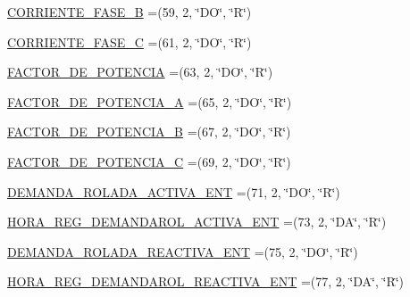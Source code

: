 \begin{DoxyCompactItemize}
\item 
\hyperlink{enumcom_1_1eneri_1_1scorpio__metertool_1_1devices_1_1_register_af873755785c13362257e1f389e8560d6}{C\+O\+R\+R\+I\+E\+N\+T\+E\+\_\+\+F\+A\+S\+E\+\_\+B} =(59, 2, \char`\"{}DO\char`\"{}, \char`\"{}R\char`\"{})
\item 
\hyperlink{enumcom_1_1eneri_1_1scorpio__metertool_1_1devices_1_1_register_ae8baada86efd91bd63541860ca63734c}{C\+O\+R\+R\+I\+E\+N\+T\+E\+\_\+\+F\+A\+S\+E\+\_\+C} =(61, 2, \char`\"{}DO\char`\"{}, \char`\"{}R\char`\"{})
\item 
\hyperlink{enumcom_1_1eneri_1_1scorpio__metertool_1_1devices_1_1_register_a9f66b6f3261ef38bcbe7ab1961222c4d}{F\+A\+C\+T\+O\+R\+\_\+\+D\+E\+\_\+\+P\+O\+T\+E\+N\+C\+IA} =(63, 2, \char`\"{}DO\char`\"{}, \char`\"{}R\char`\"{})
\item 
\hyperlink{enumcom_1_1eneri_1_1scorpio__metertool_1_1devices_1_1_register_a8274c81e20a37c161cb18649e6767a7e}{F\+A\+C\+T\+O\+R\+\_\+\+D\+E\+\_\+\+P\+O\+T\+E\+N\+C\+I\+A\+\_\+A} =(65, 2, \char`\"{}DO\char`\"{}, \char`\"{}R\char`\"{})
\item 
\hyperlink{enumcom_1_1eneri_1_1scorpio__metertool_1_1devices_1_1_register_ac5f72cb0882a0eb095633ea6c58aa6a5}{F\+A\+C\+T\+O\+R\+\_\+\+D\+E\+\_\+\+P\+O\+T\+E\+N\+C\+I\+A\+\_\+B} =(67, 2, \char`\"{}DO\char`\"{}, \char`\"{}R\char`\"{})
\item 
\hyperlink{enumcom_1_1eneri_1_1scorpio__metertool_1_1devices_1_1_register_ae27d985520a37a52c4f262e3eb7d8b74}{F\+A\+C\+T\+O\+R\+\_\+\+D\+E\+\_\+\+P\+O\+T\+E\+N\+C\+I\+A\+\_\+C} =(69, 2, \char`\"{}DO\char`\"{}, \char`\"{}R\char`\"{})
\item 
\hyperlink{enumcom_1_1eneri_1_1scorpio__metertool_1_1devices_1_1_register_a8adc597a7e526340afb7731737ba18a9}{D\+E\+M\+A\+N\+D\+A\+\_\+\+R\+O\+L\+A\+D\+A\+\_\+\+A\+C\+T\+I\+V\+A\+\_\+\+E\+NT} =(71, 2, \char`\"{}DO\char`\"{}, \char`\"{}R\char`\"{})
\item 
\hyperlink{enumcom_1_1eneri_1_1scorpio__metertool_1_1devices_1_1_register_a1a362beaab359557a28fc736a7ede7fc}{H\+O\+R\+A\+\_\+\+R\+E\+G\+\_\+\+D\+E\+M\+A\+N\+D\+A\+R\+O\+L\+\_\+\+A\+C\+T\+I\+V\+A\+\_\+\+E\+NT} =(73, 2, \char`\"{}DA\char`\"{}, \char`\"{}R\char`\"{})
\item 
\hyperlink{enumcom_1_1eneri_1_1scorpio__metertool_1_1devices_1_1_register_a154793ca39550d303c249ee1f00e176c}{D\+E\+M\+A\+N\+D\+A\+\_\+\+R\+O\+L\+A\+D\+A\+\_\+\+R\+E\+A\+C\+T\+I\+V\+A\+\_\+\+E\+NT} =(75, 2, \char`\"{}DO\char`\"{}, \char`\"{}R\char`\"{})
\item 
\hyperlink{enumcom_1_1eneri_1_1scorpio__metertool_1_1devices_1_1_register_af0aefffc40ef600350eea9ada9e441a8}{H\+O\+R\+A\+\_\+\+R\+E\+G\+\_\+\+D\+E\+M\+A\+N\+D\+A\+R\+O\+L\+\_\+\+R\+E\+A\+C\+T\+I\+V\+A\+\_\+\+E\+NT} =(77, 2, \char`\"{}DA\char`\"{}, \char`\"{}R\char`\"{})

\end{DoxyCompactItemize}
